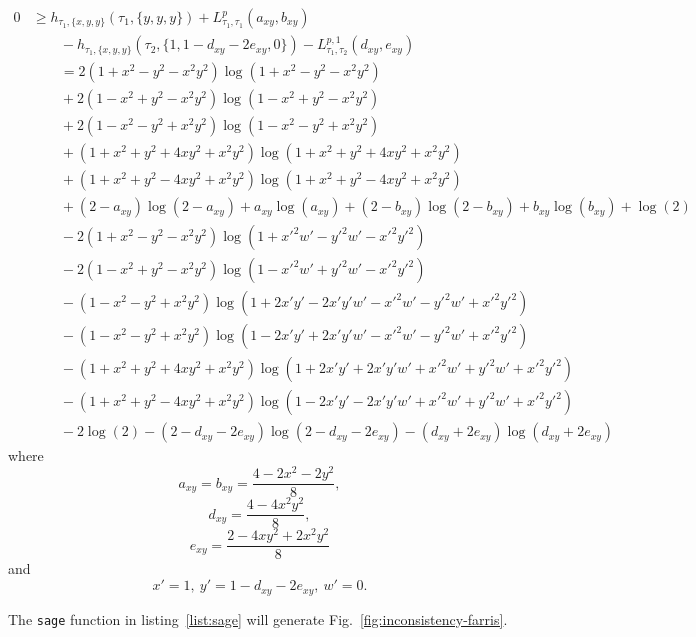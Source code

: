 \begin{align*}
    0 &\ge h_{\tau_1,\{x,y,y\}}(\tau_1,\{y, y, y\}) + L^{p}_{\tau_1,\tau_1}(a_{xy},b_{xy}) \\
      &\qquad - h_{\tau_1,\{x,y,y\}}(\tau_2,\{1, 1-d_{xy}-2e_{xy}, 0\}) - L^{p,1}_{\tau_1,\tau_2}(d_{xy},e_{xy}) \\
%
      &\qquad = 2(1+x^2-y^2-x^2y^2)\log(1+x^2-y^2-x^2y^2) \\
      &\qquad + 2(1-x^2+y^2-x^2y^2)\log(1-x^2+y^2-x^2y^2) \\
      &\qquad + 2(1-x^2-y^2+x^2y^2)\log(1-x^2-y^2+x^2y^2) \\
      &\qquad + (1+x^2+y^2+4xy^2+x^2y^2)\log(1+x^2+y^2+4xy^2+x^2y^2) \\
      &\qquad + (1+x^2+y^2-4xy^2+x^2y^2)\log(1+x^2+y^2-4xy^2+x^2y^2) \\
%
      &\qquad + (2-a_{xy})\log(2-a_{xy})+a_{xy}\log(a_{xy})+(2-b_{xy})\log(2-b_{xy})+b_{xy}\log(b_{xy})+\log(2) \\
%
      &\qquad - 2(1+x^2-y^2-x^2y^2)\log(1+x'^2w'-y'^2w'-x'^2y'^2) \\
      &\qquad - 2(1-x^2+y^2-x^2y^2)\log(1-x'^2w'+y'^2w'-x'^2y'^2) \\
      &\qquad - (1-x^2-y^2+x^2y^2)\log(1+2x'y'-2x'y'w'-x'^2w'-y'^2w'+x'^2y'^2) \\
      &\qquad - (1-x^2-y^2+x^2y^2)\log(1-2x'y'+2x'y'w'-x'^2w'-y'^2w'+x'^2y'^2) \\
      &\qquad - (1+x^2+y^2+4xy^2+x^2y^2)\log(1+2x'y'+2x'y'w'+x'^2w'+y'^2w'+x'^2y'^2) \\
      &\qquad - (1+x^2+y^2-4xy^2+x^2y^2)\log(1-2x'y'-2x'y'w'+x'^2w'+y'^2w'+x'^2y'^2) \\
%
      &\qquad - 2\log(2)-(2-d_{xy}-2e_{xy})\log(2-d_{xy}-2e_{xy})-(d_{xy}+2e_{xy})\log(d_{xy}+2e_{xy})
\end{align*}
where
$$
a_{xy} = b_{xy} = \frac{4-2x^2-2y^2}{8},
$$
$$
d_{xy} = \frac{4-4x^2y^2}{8},
$$
$$
e_{xy} = \frac{2-4xy^2+2x^2y^2}{8}
$$
and
$$
x' = 1, \ y' = 1-d_{xy}-2e_{xy}, \ w' = 0.
$$

The \texttt{sage} function in listing~\ref{list:sage} will generate Fig.~\ref{fig:inconsistency-farris}.

